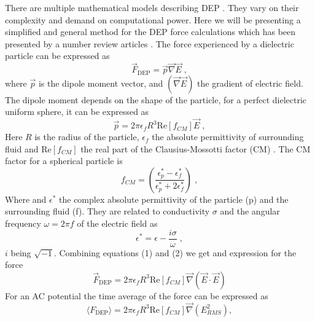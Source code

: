 \documentclass[draft]{jyflluk}
\begin{document}
There are multiple mathematical models describing DEP \cite{jubery_dielectrophoretic_2014}. They vary on their complexity and demand on computational power. Here we will be presenting a simplified and general method for the DEP force calculations which has been presented by a number review articles \cite{cottet_mydep_2019, morgan_single_2007,li_review_2014,voldman_electrical_2006}. The force experienced by a dielectric particle can be expressed as
%
\begin{equation}
   \label{eq:F_dielec}
   \vec{F}_{\mathrm{DEP}} = \vec{p} \vec{\nabla} \vec{E}\;,
\end{equation}
%
where $\vec{p}$  is the dipole moment vector, and $(\vec{\nabla} \vec{E})$ the gradient of electric field. The dipole moment depends on the shape of the particle, for a perfect dielectric uniform sphere, it can be expressed as
%
\begin{equation}
   \label{eq:dipmoment}
   \vec{p} = 2 \pi \epsilon_f R^3 \mathrm{Re}[f_{CM}] \vec{E}\;,
\end{equation}
%
Here $R$ is the radius of the particle, $\epsilon_{f}$ the absolute permittivity of surrounding fluid and $\mathrm{Re}[f_{CM}]$ the real part of the Clausius-Mossotti factor (CM) \cite{li_review_2014}. The CM factor for a spherical particle is
%
\begin{equation}
   \label{eq:CM}
   f_{CM} = \left(\frac{\epsilon_{p}^* - \epsilon_{f}^*}{\epsilon_{p}^* + 2\epsilon_{f}^*} \right)\;,
\end{equation}
%
Where and $\epsilon^*$ the complex absolute permittivity of the particle (p) and the surrounding fluid (f). They are related to conductivity $\sigma$ and the angular frequency $\omega=2\pi f$ of the electric field as 
%
\begin{equation}
   \label{eq:complex}
   \epsilon^* = \epsilon - \frac{i \sigma}{\omega}\;,
\end{equation}
%
$i$ being $\sqrt{-1}$. Combining equations (1) and (2) we get and expression for the force
%
\begin{equation}
   \label{eq:F_DEP_norm}
   \vec{F}_{\mathrm{DEP}} = 2 \pi \epsilon_f R^3 \mathrm{Re}[f_{CM}] \vec{\nabla} (\vec{E} \cdot \vec{E}) 
\end{equation}
%
For an AC potential the time average of the force can be expressed as
%
\begin{equation}
   \label{eq:F_DEP}
   \langle F_{\mathrm{DEP}}\rangle = 2 \pi \epsilon_f R^3 \mathrm{Re}[f_{CM}] \vec{\nabla} (E^2_{RMS}) ,
\end{equation}
\end{document}
